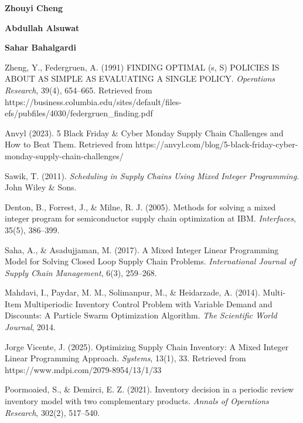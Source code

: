 \documentclass[a4paper,12pt]{article}
\begin{document}
\textbf{Zhouyi Cheng}
\begin{itemize}
\end{itemize}

\textbf{Abdullah Alsuwat}
\begin{itemize}
\end{itemize}

\textbf{Sahar Bahalgardi}
\begin{itemize}
\end{itemize}





\begin{thebibliography}{99}

Zheng, Y., Federgruen, A. (1991)
FINDING OPTIMAL (s, S) POLICIES IS ABOUT AS SIMPLE AS EVALUATING A SINGLE POLICY. \textit{Operations Research}, 39(4),  654--665.
Retrieved from https://business.columbia.edu/sites/default/files-efs/pubfiles/4030/federgruen\_finding.pdf

Anvyl (2023).
5 Black Friday \& Cyber Monday Supply Chain Challenges and How to Beat Them.
Retrieved from https://anvyl.com/blog/5-black-friday-cyber-monday-supply-chain-challenges/

Sawik, T. (2011). \textit{Scheduling in Supply Chains Using Mixed Integer Programming}.
John Wiley \& Sons.

Denton, B., Forrest, J., \& Milne, R. J. (2005).
Methods for solving a mixed integer program for semiconductor supply chain optimization at IBM. \textit{Interfaces}, 35(5), 386--399.

Saha, A., \& Asadujjaman, M. (2017).
A Mixed Integer Linear Programming Model for Solving Closed Loop Supply Chain Problems. \textit{International Journal of Supply Chain Management}, 6(3), 259--268.

Mahdavi, I., Paydar, M. M., Solimanpur, M., \& Heidarzade, A. (2014).
Multi-Item Multiperiodic Inventory Control Problem with Variable Demand and Discounts: A Particle Swarm Optimization Algorithm. \textit{The Scientific World Journal}, 2014.

Jorge Vicente, J. (2025).
Optimizing Supply Chain Inventory: A Mixed Integer Linear Programming Approach. \textit{Systems}, 13(1), 33.
Retrieved from https://www.mdpi.com/2079-8954/13/1/33

Poormoaied, S., \& Demirci, E. Z. (2021).
Inventory decision in a periodic review inventory model with two complementary products. \textit{Annals of Operations Research}, 302(2), 517--540.


\end{thebibliography}
\end{document}

